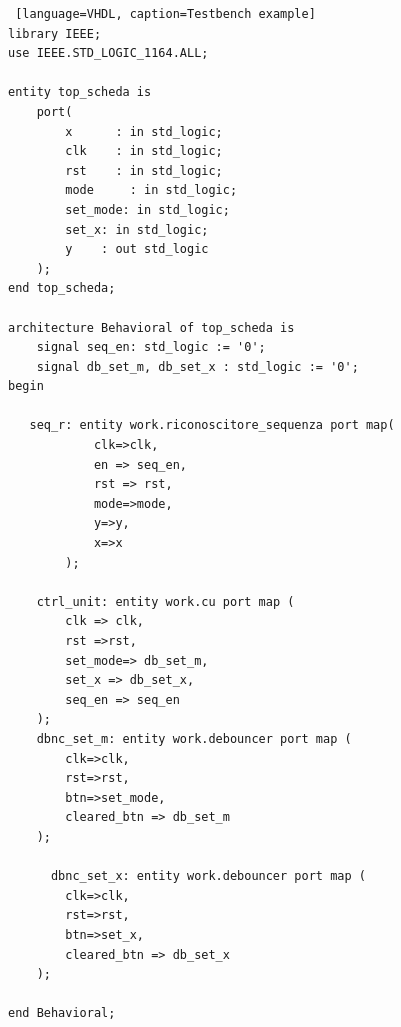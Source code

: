 \begin{lstlisting} [language=VHDL, caption=Testbench example]
library IEEE;
use IEEE.STD_LOGIC_1164.ALL;

entity top_scheda is
    port(
        x      : in std_logic;
        clk    : in std_logic;
        rst    : in std_logic;
        mode     : in std_logic;
        set_mode: in std_logic;
        set_x: in std_logic;
        y    : out std_logic
    );
end top_scheda;

architecture Behavioral of top_scheda is
    signal seq_en: std_logic := '0';
    signal db_set_m, db_set_x : std_logic := '0';
begin

   seq_r: entity work.riconoscitore_sequenza port map(
            clk=>clk,
            en => seq_en,
            rst => rst,
            mode=>mode,
            y=>y,
            x=>x
        );
    
    ctrl_unit: entity work.cu port map (
        clk => clk,
        rst =>rst,
        set_mode=> db_set_m,
        set_x => db_set_x,
        seq_en => seq_en
    );
    dbnc_set_m: entity work.debouncer port map (
        clk=>clk,
        rst=>rst,
        btn=>set_mode,
        cleared_btn => db_set_m
    );
    
      dbnc_set_x: entity work.debouncer port map (
        clk=>clk,
        rst=>rst,
        btn=>set_x,
        cleared_btn => db_set_x
    );

end Behavioral;
\end{lstlisting}